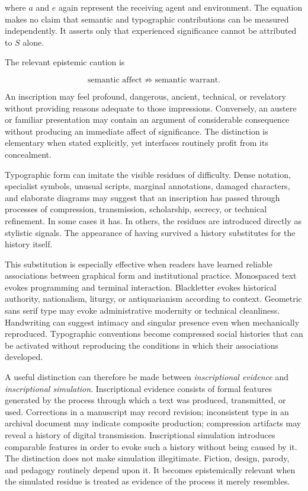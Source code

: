\documentclass[11pt]{article}
\newcommand{\term}[1]{\emph{#1}}
\begin{document}
where \(a\) and \(e\) again represent the receiving agent and environment.
The equation makes no claim that semantic and typographic contributions can
be measured independently. It asserts only that experienced significance
cannot be attributed to \(S\) alone.

The relevant epistemic caution is

\begin{equation}
  \text{semantic affect}
  \not\Rightarrow
  \text{semantic warrant}.
  \label{eq:affect-warrant}
\end{equation}

An inscription may feel profound, dangerous, ancient, technical, or
revelatory without providing reasons adequate to those impressions.
Conversely, an austere or familiar presentation may contain an argument of
considerable consequence without producing an immediate affect of
significance. The distinction is elementary when stated explicitly, yet
interfaces routinely profit from its concealment.

Typographic form can imitate the visible residues of difficulty. Dense
notation, specialist symbols, unusual scripts, marginal annotations, damaged
characters, and elaborate diagrams may suggest that an inscription has passed
through processes of compression, transmission, scholarship, secrecy, or
technical refinement. In some cases it has. In others, the residues are
introduced directly as stylistic signals. The appearance of having survived a
history substitutes for the history itself.

This substitution is especially effective when readers have learned reliable
associations between graphical form and institutional practice. Monospaced
text evokes programming and terminal interaction. Blackletter evokes
historical authority, nationalism, liturgy, or antiquarianism according to
context. Geometric sans serif type may evoke administrative modernity or
technical cleanliness. Handwriting can suggest intimacy and singular
presence even when mechanically reproduced. Typographic conventions become
compressed social histories that can be activated without reproducing the
conditions in which their associations developed.

A useful distinction can therefore be made between \term{inscriptional
evidence} and \term{inscriptional simulation}. Inscriptional evidence consists
of formal features generated by the process through which a text was
produced, transmitted, or used. Corrections in a manuscript may record
revision; inconsistent type in an archival document may indicate composite
production; compression artifacts may reveal a history of digital
transmission. Inscriptional simulation introduces comparable features in
order to evoke such a history without being caused by it. The distinction
does not make simulation illegitimate. Fiction, design, parody, and
pedagogy routinely depend upon it. It becomes epistemically relevant when
the simulated residue is treated as evidence of the process it merely
resembles.
\end{document}
